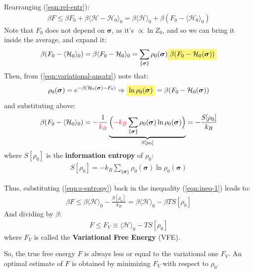 \documentclass[../template.tex]{subfiles}
\begin{document}
\medskip

Rearranging (\ref{eqn:rel-entr}):
\begin{align}\label{eqn:ineq-1}
    \beta F \leq \beta F_0 + \beta \langle \mathcal{H} - \mathcal{H}_0 \rangle_0 = \beta \langle \mathcal{H} \rangle_0 + \beta {(F_0 - \langle \mathcal{H}_0 \rangle_0)}
\end{align}
Note that $F_0$ does not depend on $\bm{\sigma}$, as it's $\propto \ln Z_0$, and so we can bring it inside the average, and expand it:
\begin{align*}
    \beta (F_0 - \langle \mathcal{H}_0 \rangle_0) = \beta \langle F_0 - \mathcal{H}_0 \rangle_0 =  \sum_{\{\bm{\sigma}\}} \rho_0(\bm{\sigma}) \hlc{Yellow}{\beta(F_0 - \mathcal{H}_0(\bm{\sigma}))}
\end{align*}
Then, from (\ref{eqn:variational-ansatz}) note that:
\begin{align*}
    \rho_0(\bm{\sigma}) = e^{-\beta (\mathcal{H}_0(\bm{\sigma}) - F_0)} \Rightarrow \hlc{Yellow}{\ln \rho_0(\bm{\sigma})} = \beta(F_0 - \mathcal{H}_0(\bm{\sigma}))
\end{align*}
and substituting above:
\begin{align}\label{eqn:s-entropy}
    \beta (F_0 - \langle \mathcal{H}_0 \rangle_0) =\textcolor{Red}{-}\frac{1}{\textcolor{Red}{k_B}}\underbrace{\Big( \textcolor{Red}{-k_B} \sum_{\{\bm{\sigma}\}} \rho_0(\bm{\sigma}) \ln \rho_0(\bm{\sigma})\Big)}_{S[\rho_0]}  = -\frac{S[\rho_0]}{k_B} 
\end{align}
where $S[\rho_0]$ is the \textbf{information entropy} of $\rho_0$:
\begin{align*}
    S[\rho_0] = -k_B \sum_{\{\bm{\sigma}\}} \rho_0(\bm{\sigma}) \ln \rho_0(\bm{\sigma})
\end{align*} 

Thus, substituting (\ref{eqn:s-entropy}) back in the inequality (\ref{eqn:ineq-1}) leads to:
\begin{align}\label{eqn:var-principle}
    \beta F \leq  \beta \langle \mathcal{H} \rangle_0 -\frac{S[\rho_0]}{k_B} = \beta \langle \mathcal{H} \rangle_0 - {\beta T S[\rho_0]}
\end{align}
And dividing by $\beta$:
\begin{align*}
    F \leq F_V \equiv \langle \mathcal{H} \rangle_0 - T S[\rho_0]
\end{align*}
where $F_V$ is called the \textbf{Variational Free Energy} (VFE). 

So,  the true free energy $F$ is always less or equal to the variational one $F_V$. An optimal estimate of $F$ is obtained by minimizing $F_V$ with respect to $\rho_0$.
\end{document}
